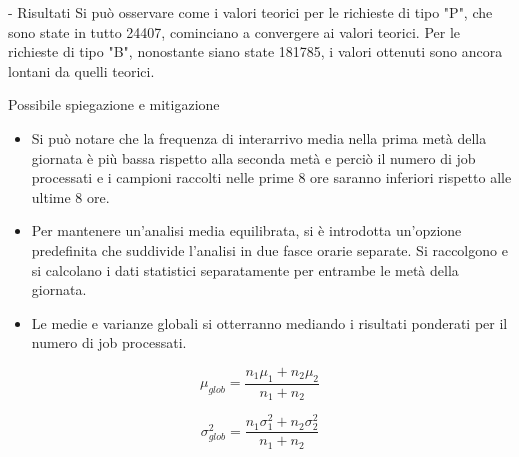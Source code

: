 \documentclass[xcolor=table]{beamer}
\newcommand{\key}[1]{\texttt{\StrSubstitute{#1}{_}{\_}}}
\begin{document}
\begin{frame}{\key{verify1.py} - Risultati}
Si può osservare come i valori teorici per le richieste di tipo "P", che sono state in tutto 24407, cominciano a convergere ai valori teorici. Per le richieste di tipo "B", nonostante siano state 181785, i valori ottenuti sono ancora lontani da quelli teorici.
\end{frame}

\begin{frame}{Possibile spiegazione e mitigazione}\justifying
\begin{itemize}
\item Si può notare che la frequenza di interarrivo media nella prima metà della giornata è più bassa rispetto alla seconda metà e perciò il numero di job processati e i campioni raccolti nelle prime 8 ore saranno inferiori rispetto alle ultime 8 ore.

\item Per mantenere un'analisi media equilibrata, si è introdotta un'opzione predefinita che suddivide l'analisi in due fasce orarie separate. Si raccolgono e si calcolano i dati statistici separatamente per entrambe le metà della giornata. 

\item Le medie e varianze globali si otterranno mediando i risultati ponderati per il numero di job processati.
\end{itemize}
\bigskip

\begin{minipage}{0.5\textwidth}
\[
	\mu_{glob} = \frac{n_1 \mu_1 + n_2 \mu_2}{n_1 + n_2}
\]
\end{minipage}
\begin{minipage}{0.5\textwidth}
\[
	\sigma^2_{glob} = \frac{n_1 \sigma^2_1 + n_2 \sigma^2_2}{n_1 + n_2}
\]
\end{minipage}
\end{frame}
\end{document}
